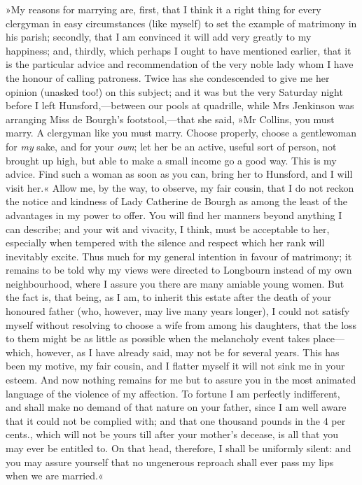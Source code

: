 »My reasons for marrying are, first, that I think it a right thing for every clergyman in easy circumstances (like myself) to set the example of matrimony in his parish; secondly, that I am convinced it will add very greatly to my happiness; and, thirdly, which perhaps I ought to have mentioned earlier, that it is the particular advice and recommendation of the very noble lady whom I have the honour of calling patroness. Twice has she condescended to give me her opinion (unasked too!) on this subject; and it was but the very Saturday night before I left Hunsford,—between our pools at quadrille, while Mrs Jenkinson was arranging Miss de Bourgh's footstool,—that she said, »Mr Collins, you must marry. A clergyman like you must marry. Choose properly, choose a gentlewoman for \textit{my} sake, and for your \textit{own}; let her be an active, useful sort of person, not brought up high, but able to make a small income go a good way. This is my advice. Find such a woman as soon as you can, bring her to Hunsford, and I will visit her.« Allow me, by the way, to observe, my fair cousin, that I do not reckon the notice and kindness of Lady Catherine de Bourgh as among the least of the advantages in my power to offer. You will find her manners beyond anything I can describe; and your wit and vivacity, I think, must be acceptable to her, especially when tempered with the silence and respect which her rank will inevitably excite. Thus much for my general intention in favour of matrimony; it remains to be told why my views were directed to Longbourn instead of my own neighbourhood, where I assure you there are many amiable young women. But the fact is, that being, as I am, to inherit this estate after the death of your honoured father (who, however, may live many years longer), I could not satisfy myself without resolving to choose a wife from among his daughters, that the loss to them might be as little as possible when the melancholy event takes place—which, however, as I have already said, may not be for several years. This has been my motive, my fair cousin, and I flatter myself it will not sink me in your esteem. And now nothing remains for me but to assure you in the most animated language of the violence of my affection. To fortune I am perfectly indifferent, and shall make no demand of that nature on your father, since I am well aware that it could not be complied with; and that one thousand pounds in the 4 per cents., which will not be yours till after your mother's decease, is all that you may ever be entitled to. On that head, therefore, I shall be uniformly silent: and you may assure yourself that no ungenerous reproach shall ever pass my lips when we are married.«

